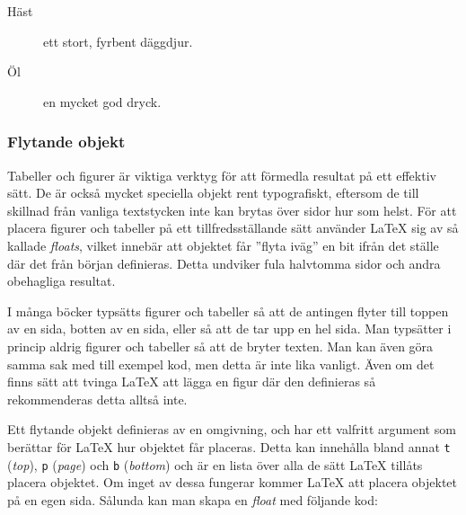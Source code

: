 \documentclass[lang=sv,ptsize=10pt,font=none,nomath,titles=bf,../../a4.tex]{subfiles}
\begin{document}
\begin{kod}[tp]
{\begin{minipage}{0.475\textwidth}
\begin{latexcode}
\begin{description}
\item[Häst] ett stort,
    fyrbent däggdjur.
\item[Öl] en mycket god
    dryck.
\end{description}
			\end{latexcode}
		\end{minipage}
		\hfil
		\begin{minipage}{0.475\textwidth} %
		\end{minipage}
	}
	\caption{De tre enkla listomgivningar \LaTeX{} tillhandahåller.}
	\label{ex:listor}
\end{kod}

\subsubsection{Flytande objekt }\label{sec:floats}
Tabeller och figurer är viktiga verktyg för att förmedla resultat på
ett effektiv sätt. De är också mycket speciella objekt rent typografiskt,
eftersom de till skillnad från vanliga textstycken inte kan brytas över
sidor hur som helst. För att placera figurer och tabeller på ett
tillfredsställande sätt använder \LaTeX{} sig av så kallade \emph{floats},
vilket innebär att objektet får ”flyta iväg” en bit ifrån det ställe där
det från början definieras. Detta undviker fula halvtomma sidor och andra
obehagliga resultat.

I många böcker typsätts figurer och tabeller så att de antingen flyter
till toppen av en sida, botten av en sida, eller så att de tar upp en hel
sida. Man typsätter i princip aldrig figurer och tabeller så att de bryter
texten. Man kan även göra samma sak med till exempel kod, men detta är
inte lika vanligt. Även om det finns sätt att tvinga \LaTeX{} att lägga en
figur där den definieras så rekommenderas detta alltså inte.

Ett flytande objekt definieras av en omgivning, och har ett valfritt
argument som berättar för \LaTeX{} hur objektet får placeras. Detta kan
innehålla bland annat \texttt{t} (\emph{top}), \texttt{p} (\emph{page})
och \texttt{b} (\emph{bottom}) och är en lista över alla de sätt \LaTeX{}
tillåts placera objektet. Om inget av dessa fungerar kommer \LaTeX{} att
placera objektet på en egen sida. Sålunda kan man skapa en \emph{float}
med följande kod:
\begin{latexcode}
\begin{<floattyp>}[tbp] %
\end{<floattyp>}
\end{latexcode}
\end{document}
